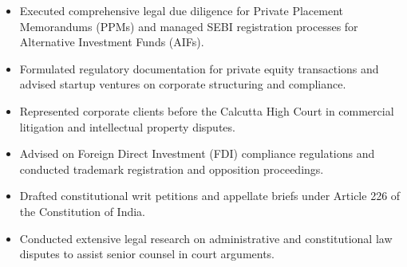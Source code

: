 \begin{itemize}[leftmargin=*, noitemsep]
    \item Executed comprehensive legal due diligence for Private Placement Memorandums (PPMs) and managed SEBI registration processes for Alternative Investment Funds (AIFs).
    \item Formulated regulatory documentation for private equity transactions and advised startup ventures on corporate structuring and compliance.
\end{itemize}

\vspace{6pt}

\begin{itemize}[leftmargin=*, noitemsep]
    \item Represented corporate clients before the Calcutta High Court in commercial litigation and intellectual property disputes.
    \item Advised on Foreign Direct Investment (FDI) compliance regulations and conducted trademark registration and opposition proceedings.
\end{itemize}

\vspace{6pt}

\begin{itemize}[leftmargin=*, noitemsep]
    \item Drafted constitutional writ petitions and appellate briefs under Article 226 of the Constitution of India.
    \item Conducted extensive legal research on administrative and constitutional law disputes to assist senior counsel in court arguments.
\end{itemize}
